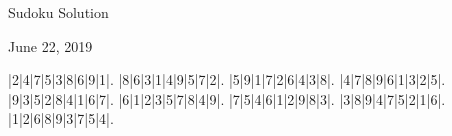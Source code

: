 \documentclass{article}
\begin{document}
\begin{center}
\Huge{Sudoku Solution}
\end{center}
\begin{center}
\Large{June 22, 2019}
\end{center}
\begin{sudoku}
|2|4|7|5|3|8|6|9|1|.
|8|6|3|1|4|9|5|7|2|.
|5|9|1|7|2|6|4|3|8|.
|4|7|8|9|6|1|3|2|5|.
|9|3|5|2|8|4|1|6|7|.
|6|1|2|3|5|7|8|4|9|.
|7|5|4|6|1|2|9|8|3|.
|3|8|9|4|7|5|2|1|6|.
|1|2|6|8|9|3|7|5|4|.
\end{sudoku}
\end{document}
